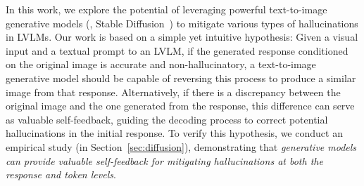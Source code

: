 In this work, we explore the potential of leveraging powerful text-to-image generative models (\eg, Stable Diffusion~\citep{rombach2021highresolution,podell2024sdxl}) to mitigate various types of hallucinations in LVLMs. 
Our work is based on a simple yet intuitive hypothesis: Given a visual input and a textual prompt to an LVLM, if the generated response conditioned on the original image is accurate and non-hallucinatory,  a text-to-image generative model should be capable of reversing this process to produce a similar image from that response. 
Alternatively, if there is a discrepancy between the original image and the one generated from the response, this difference can serve as valuable self-feedback, guiding the decoding process to correct potential hallucinations in the initial response.
To verify this hypothesis, we conduct an empirical study (in Section~\ref{sec:diffusion}), demonstrating that \textit{generative models can provide valuable self-feedback for mitigating hallucinations at both the response and token levels}.




